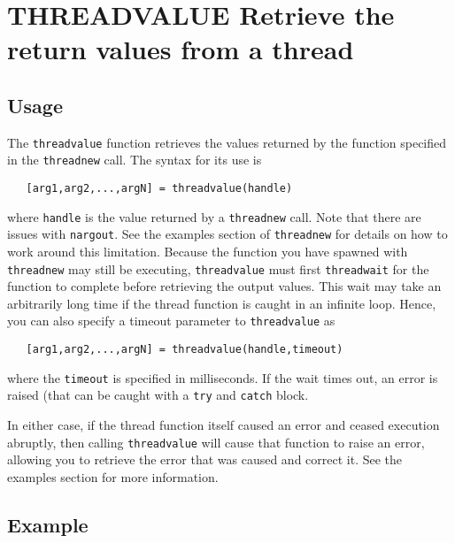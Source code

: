 \section{THREADVALUE Retrieve the return values from a thread}

\subsection{Usage}

The \verb|threadvalue| function retrieves the values returned
by the function specified in the \verb|threadnew| call.  The
syntax for its use is
\begin{verbatim}
   [arg1,arg2,...,argN] = threadvalue(handle)
\end{verbatim}
where \verb|handle| is the value returned by a \verb|threadnew| call.
Note that there are issues with \verb|nargout|.  See the examples
section of \verb|threadnew| for details on how to work around this
limitation.  Because the function you have spawned with \verb|threadnew|
may still be executing, \verb|threadvalue| must first \verb|threadwait|
for the function to complete before retrieving the output values.
This wait may take an arbitrarily long time if the thread function
is caught in an infinite loop.  Hence, you can also specify
a timeout parameter to \verb|threadvalue| as
\begin{verbatim}
   [arg1,arg2,...,argN] = threadvalue(handle,timeout)
\end{verbatim}
where the \verb|timeout| is specified in milliseconds.  If the
wait times out, an error is raised (that can be caught with a
\verb|try| and \verb|catch| block.  

In either case, if the thread function itself caused an error
and ceased execution abruptly, then calling \verb|threadvalue| will
cause that function to raise an error, allowing you to retrieve
the error that was caused and correct it.  See the examples section
for more information.
\subsection{Example}

